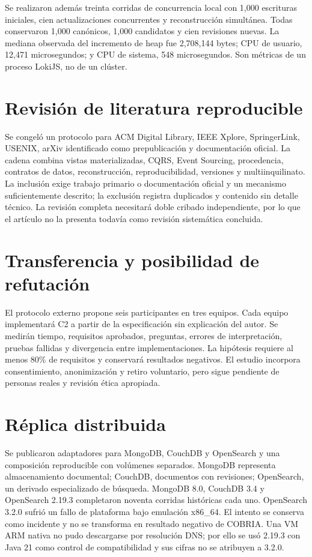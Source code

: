 \documentclass[11pt]{article}
\begin{document}
Se realizaron además treinta corridas de concurrencia local con 1,000 escrituras iniciales, cien actualizaciones concurrentes y reconstrucción simultánea. Todas conservaron 1,000 canónicos, 1,000 candidatos y cien revisiones nuevas. La mediana observada del incremento de heap fue 2,708,144 bytes; CPU de usuario, 12,471 microsegundos; y CPU de sistema, 548 microsegundos. Son métricas de un proceso LokiJS, no de un clúster.

\section{Revisión de literatura reproducible}
Se congeló un protocolo para ACM Digital Library, IEEE Xplore, SpringerLink, USENIX, arXiv identificado como prepublicación y documentación oficial. La cadena combina vistas materializadas, CQRS, Event Sourcing, procedencia, contratos de datos, reconstrucción, reproducibilidad, versiones y multiinquilinato. La inclusión exige trabajo primario o documentación oficial y un mecanismo suficientemente descrito; la exclusión registra duplicados y contenido sin detalle técnico. La revisión completa necesitará doble cribado independiente, por lo que el artículo no la presenta todavía como revisión sistemática concluida.

\section{Transferencia y posibilidad de refutación}
El protocolo externo propone seis participantes en tres equipos. Cada equipo implementará C2 a partir de la especificación sin explicación del autor. Se medirán tiempo, requisitos aprobados, preguntas, errores de interpretación, pruebas fallidas y divergencia entre implementaciones. La hipótesis requiere al menos 80\% de requisitos y conservará resultados negativos. El estudio incorpora consentimiento, anonimización y retiro voluntario, pero sigue pendiente de personas reales y revisión ética apropiada.

\section{Réplica distribuida}
Se publicaron adaptadores para MongoDB, CouchDB y OpenSearch y una composición reproducible con volúmenes separados. MongoDB representa almacenamiento documental; CouchDB, documentos con revisiones; OpenSearch, un derivado especializado de búsqueda. MongoDB 8.0, CouchDB 3.4 y OpenSearch 2.19.3 completaron noventa corridas históricas cada uno. OpenSearch 3.2.0 sufrió un fallo de plataforma bajo emulación x86\_64. El intento se conserva como incidente y no se transforma en resultado negativo de COBRIA. Una VM ARM nativa no pudo descargarse por resolución DNS; por ello se usó 2.19.3 con Java 21 como control de compatibilidad y sus cifras no se atribuyen a 3.2.0.
\end{document}

